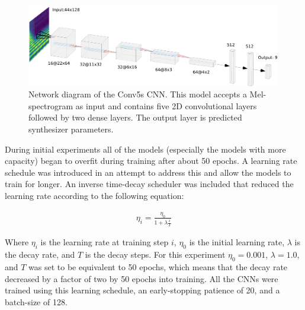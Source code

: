 \begin{figure}[ht]
    \centering
    \includegraphics[width=0.99\textwidth]{figures/inverse-synth/CONV5s_Diagram.png}
    \caption{Network diagram of the Conv5s CNN. This model accepts a Mel-spectrogram as input and contains five 2D convolutional layers followed by two dense layers. The output layer is predicted synthesizer parameters.}
    \label{fig:conv5s}
\end{figure}

During initial experiments all of the models (especially the models with more capacity) began to overfit during training after about 50 epochs. A learning rate schedule was introduced in an attempt to address this and allow the models to train for longer. An inverse time-decay scheduler was included that reduced the learning rate according to the following equation:

\begin{align}
    \eta_i = \frac{\eta_0}{1 + \lambda\frac{i}{T}}
\end{align}

Where $\eta_i$ is the learning rate at training step $i$, $\eta_0$ is the initial learning rate, $\lambda$ is the decay rate, and $T$ is the decay steps. For this experiment $\eta_0=0.001$, $\lambda=1.0$, and $T$ was set to be equivalent to 50 epochs, which means that the decay rate decreased by a factor of two by 50 epochs into training. All the CNNs were trained using this learning schedule, an early-stopping patience of 20, and a batch-size of 128. 


